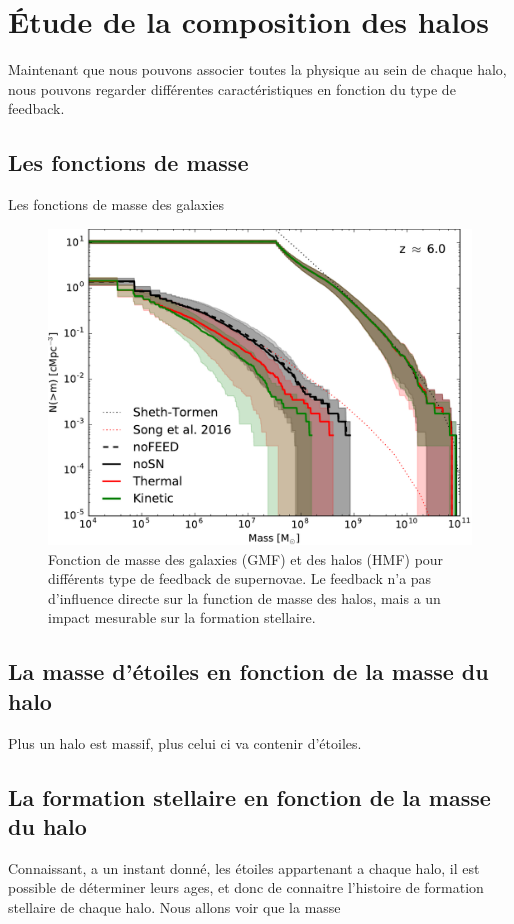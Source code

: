 \section{Étude de la composition des halos}

Maintenant que nous pouvons associer toutes la physique au sein de chaque halo, nous pouvons regarder  différentes caractéristiques en fonction du type de feedback.

\subsection{Les fonctions de masse}

Les fonctions de masse des galaxies 


\begin{figure}[bth]
		\includegraphics[width=.95\linewidth]{img/03/ghmf.pdf}
        \caption{Fonction de masse des galaxies (GMF) et des halos (HMF) pour différents type de feedback de supernovae.
        Le feedback n'a pas d'influence directe sur la function de masse des halos, mais a un impact mesurable sur la formation stellaire.
        }
 		\label{fig:ghmf}
\end{figure}



\subsection{La masse d'étoiles en fonction de la masse du halo}
Plus un halo est massif, plus celui ci va contenir d'étoiles.



\subsection{La formation stellaire en fonction de la masse du halo}
Connaissant, a un instant donné, les étoiles appartenant a chaque halo, il est possible de déterminer leurs ages, et donc de connaitre l'histoire de formation stellaire de chaque halo.
Nous allons voir que la masse 


